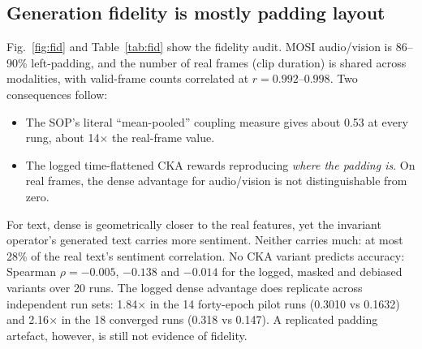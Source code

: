 \documentclass[lettersize,journal]{IEEEtran}
\begin{document}
\subsection{Generation fidelity is mostly padding layout}
Fig.~\ref{fig:fid} and Table~\ref{tab:fid} show the fidelity audit. MOSI audio/vision is 86--90\% left-padding, and the number of real frames (clip duration) is shared across modalities, with valid-frame counts correlated at $r=0.992$--$0.998$. Two consequences follow:
\begin{itemize}
\item The SOP's literal ``mean-pooled'' coupling measure gives about 0.53 at every rung, about 14$\times$ the real-frame value.
\item The logged time-flattened CKA rewards reproducing \emph{where the padding is}. On real frames, the dense advantage for audio/vision is not distinguishable from zero.
\end{itemize}
For text, dense is geometrically closer to the real features, yet the invariant operator's generated text carries more sentiment. Neither carries much: at most 28\% of the real text's sentiment correlation. No CKA variant predicts accuracy: Spearman $\rho=-0.005$, $-0.138$ and $-0.014$ for the logged, masked and debiased variants over 20 runs. The logged dense advantage does replicate across independent run sets: 1.84$\times$ in the 14 forty-epoch pilot runs (0.3010 vs 0.1632) and 2.16$\times$ in the 18 converged runs (0.318 vs 0.147). A replicated padding artefact, however, is still not evidence of fidelity.

\begin{table}[!t]
\caption{Fidelity of generated features, length ladder $\ell\le200$, 9 runs per arm (Welch $p$).\label{tab:fid}}
\centering
{}
\end{table}
\end{document}
